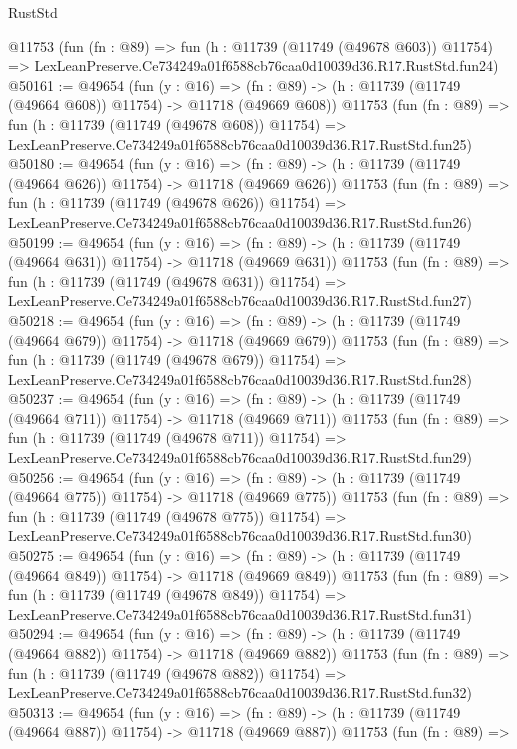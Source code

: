 \begin{lexlean}{RustStd}
\begin{coremodule}
    @11753
    (fun (fn : @89) =>
    fun (h : @11739 (@11749 (@49678 @603)) @11754) =>
    LexLeanPreserve.Ce734249a01f6588cb76caa0d10039d36.R17.RustStd.fun24)
@50161 := @49654
    (fun (y : @16) =>
    (fn : @89) -> (h : @11739 (@11749 (@49664 @608)) @11754) -> @11718 (@49669 @608))
    @11753
    (fun (fn : @89) =>
    fun (h : @11739 (@11749 (@49678 @608)) @11754) =>
    LexLeanPreserve.Ce734249a01f6588cb76caa0d10039d36.R17.RustStd.fun25)
@50180 := @49654
    (fun (y : @16) =>
    (fn : @89) -> (h : @11739 (@11749 (@49664 @626)) @11754) -> @11718 (@49669 @626))
    @11753
    (fun (fn : @89) =>
    fun (h : @11739 (@11749 (@49678 @626)) @11754) =>
    LexLeanPreserve.Ce734249a01f6588cb76caa0d10039d36.R17.RustStd.fun26)
@50199 := @49654
    (fun (y : @16) =>
    (fn : @89) -> (h : @11739 (@11749 (@49664 @631)) @11754) -> @11718 (@49669 @631))
    @11753
    (fun (fn : @89) =>
    fun (h : @11739 (@11749 (@49678 @631)) @11754) =>
    LexLeanPreserve.Ce734249a01f6588cb76caa0d10039d36.R17.RustStd.fun27)
@50218 := @49654
    (fun (y : @16) =>
    (fn : @89) -> (h : @11739 (@11749 (@49664 @679)) @11754) -> @11718 (@49669 @679))
    @11753
    (fun (fn : @89) =>
    fun (h : @11739 (@11749 (@49678 @679)) @11754) =>
    LexLeanPreserve.Ce734249a01f6588cb76caa0d10039d36.R17.RustStd.fun28)
@50237 := @49654
    (fun (y : @16) =>
    (fn : @89) -> (h : @11739 (@11749 (@49664 @711)) @11754) -> @11718 (@49669 @711))
    @11753
    (fun (fn : @89) =>
    fun (h : @11739 (@11749 (@49678 @711)) @11754) =>
    LexLeanPreserve.Ce734249a01f6588cb76caa0d10039d36.R17.RustStd.fun29)
@50256 := @49654
    (fun (y : @16) =>
    (fn : @89) -> (h : @11739 (@11749 (@49664 @775)) @11754) -> @11718 (@49669 @775))
    @11753
    (fun (fn : @89) =>
    fun (h : @11739 (@11749 (@49678 @775)) @11754) =>
    LexLeanPreserve.Ce734249a01f6588cb76caa0d10039d36.R17.RustStd.fun30)
@50275 := @49654
    (fun (y : @16) =>
    (fn : @89) -> (h : @11739 (@11749 (@49664 @849)) @11754) -> @11718 (@49669 @849))
    @11753
    (fun (fn : @89) =>
    fun (h : @11739 (@11749 (@49678 @849)) @11754) =>
    LexLeanPreserve.Ce734249a01f6588cb76caa0d10039d36.R17.RustStd.fun31)
@50294 := @49654
    (fun (y : @16) =>
    (fn : @89) -> (h : @11739 (@11749 (@49664 @882)) @11754) -> @11718 (@49669 @882))
    @11753
    (fun (fn : @89) =>
    fun (h : @11739 (@11749 (@49678 @882)) @11754) =>
    LexLeanPreserve.Ce734249a01f6588cb76caa0d10039d36.R17.RustStd.fun32)
@50313 := @49654
    (fun (y : @16) =>
    (fn : @89) -> (h : @11739 (@11749 (@49664 @887)) @11754) -> @11718 (@49669 @887))
    @11753
    (fun (fn : @89) =>

\end{coremodule}
\end{lexlean}

